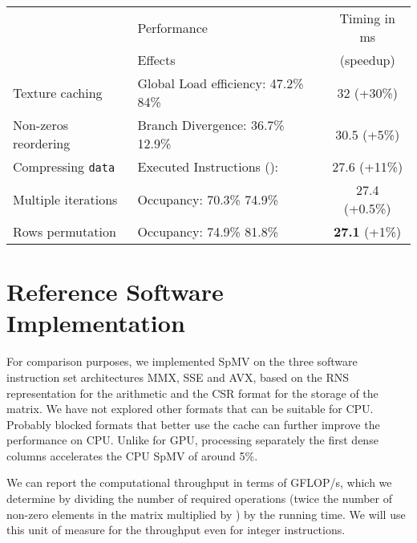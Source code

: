 \documentclass[runningheads,orivec]{llncs}
\begin{document}
	\begin{center}
    \begin{tabular}{|l||l|c|}
      \hline
      & \footnotesize Performance & \footnotesize Timing in ms \\
      & \footnotesize Effects & \footnotesize (speedup) \\
      \hline
      \hline
      {\footnotesize Texture caching} & {\footnotesize Global Load efficiency: 47.2\%  84\%} & \footnotesize 32 (+30\%)\\
      \hline
      {\footnotesize Non-zeros reordering} & {\footnotesize Branch Divergence: 36.7\%  12.9\%} & \footnotesize 30.5 (+5\%)\\
      \hline
      {\footnotesize Compressing \texttt{data}} & {\footnotesize Executed Instructions ():   } & \footnotesize 27.6 (+11\%)\\
      \hline
      {\small Multiple iterations} & {\footnotesize Occupancy: 70.3\%  74.9\%} & \footnotesize 27.4 (+0.5\%)\\
      \hline
      {\small Rows permutation} & {\footnotesize Occupancy: 74.9\%  81.8\%} & \footnotesize \textbf{27.1} (+1\%)\\
      \hline
    \end{tabular}
\end{center}

\vspace*{-0.25cm}

\section{Reference Software Implementation}

\label{soft}
For comparison purposes, we implemented SpMV on the three software instruction set architectures MMX, SSE and AVX, based on the RNS representation for the arithmetic and the CSR format for the storage of the matrix. We have not explored other formats that can be suitable for CPU. Probably blocked formats that better use the cache can further improve the performance on CPU. Unlike for GPU, processing separately the first dense columns accelerates the CPU SpMV of around 5\%.


We can report the computational throughput in terms of GFLOP/s, which we determine by dividing the number of required operations (twice the number of non-zero elements in the matrix  multiplied by ) by the running time. We will use this unit of measure for the throughput even for integer instructions.
\end{document}

